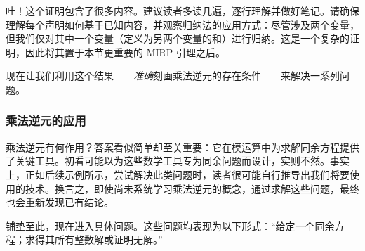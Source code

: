 哇！这个证明包含了很多内容。建议读者多读几遍，逐行理解并做好笔记。请确保理解每个声明如何基于已知内容，并观察归纳法的应用方式：尽管涉及两个变量，但我们仅对其中一个变量（定义为另两个变量的和）进行归纳。这是一个复杂的证明，因此将其置于本节更重要的 MIRP 引理之后。

现在让我们利用这个结果——\emph{准确}刻画乘法逆元的存在条件——来解决一系列问题。

\subsubsection*{乘法逆元的应用}

乘法逆元有何作用？答案看似简单却至关重要：它在模运算中为求解同余方程提供了关键工具。初看可能以为这些数学工具专为同余问题而设计，实则不然。事实上，正如后续示例所示，尝试解决此类问题时，读者很可能自行推导出我们将要使用的技术。换言之，即使尚未系统学习乘法逆元的概念，通过求解这些问题，最终也会重新发现已有结论。

铺垫至此，现在进入具体问题。这些问题均表现为以下形式：``给定一个同余方程；求得其所有整数解或证明无解。''

